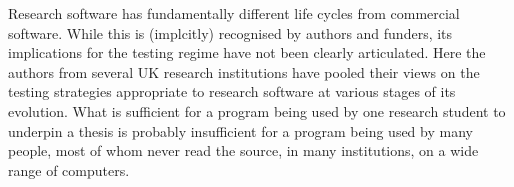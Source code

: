 Research software has fundamentally different life cycles from commercial software. While this is (implcitly) recognised by authors and funders, its implications for the testing regime have not been clearly articulated. Here the authors from several UK research institutions have pooled their views on the testing strategies appropriate to research software at various stages of its evolution. What is sufficient for a program being used by one research student to underpin a thesis is probably insufficient for a program being used by many people, most of whom never read the source, in many institutions, on a wide range of computers.
